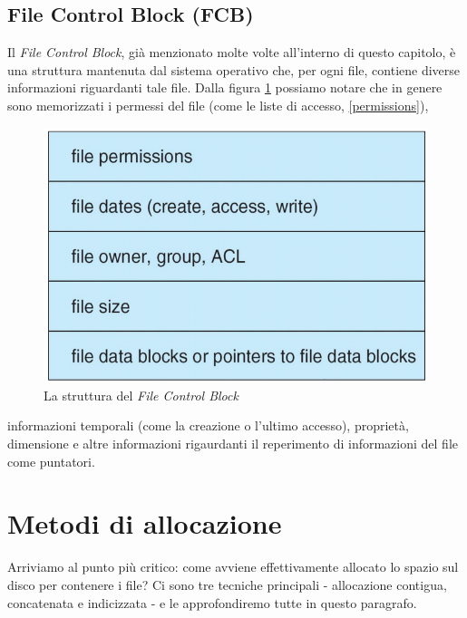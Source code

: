\subsection{File Control Block (FCB)}\label{FCB}
Il \textit{File Control Block}, già menzionato molte volte all'interno di questo capitolo, è una struttura mantenuta dal sistema operativo che, per ogni file, contiene diverse informazioni riguardanti tale file. Dalla figura \ref{fig:FCB} possiamo notare che in genere sono memorizzati i permessi del file (come le liste di accesso, \ref{permissions}),
\begin{figure}[h]
    \centering
    \includegraphics[width = .45\textwidth]{../res/imgs/file system implementation/FCB.png}
    \caption{La struttura del \textit{File Control Block}}
    \label{fig:FCB}
\end{figure}
informazioni temporali (come la creazione o l'ultimo accesso), proprietà, dimensione e altre informazioni rigaurdanti il reperimento di informazioni del file come puntatori. 

% 
\section{Metodi di allocazione}
Arriviamo al punto più critico: come avviene effettivamente allocato lo spazio sul disco per contenere i file? Ci sono tre tecniche principali - allocazione contigua, concatenata e indicizzata - e le approfondiremo tutte in questo paragrafo.

